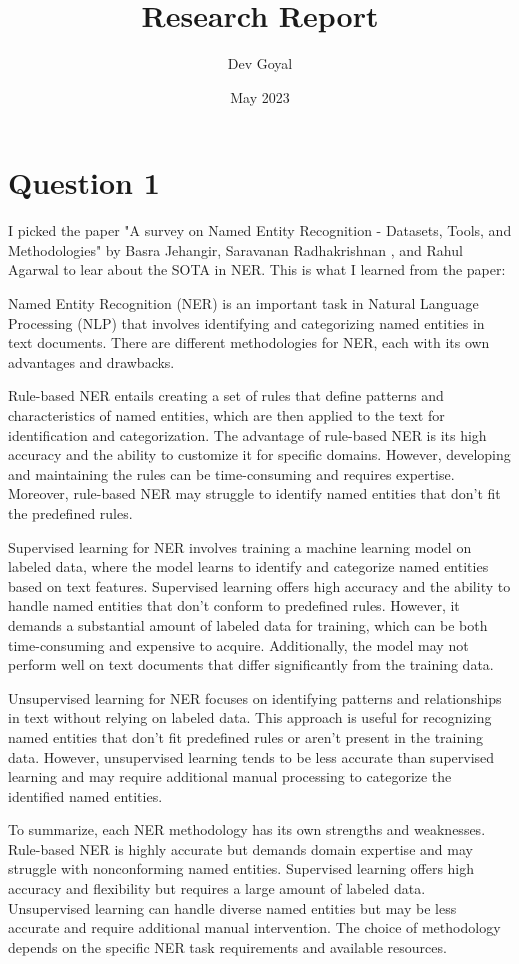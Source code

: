 \documentclass{article}
\title{Research Report}
\author{Dev Goyal}
\date{May 2023}
\begin{document}
\maketitle

\section{Question 1}

I picked the paper "A survey on Named Entity Recognition - Datasets, Tools, and
Methodologies" by Basra Jehangir, Saravanan Radhakrishnan , and Rahul Agarwal to lear about the SOTA in NER. This is what I learned from the paper:

Named Entity Recognition (NER) is an important task in Natural Language Processing (NLP) that involves identifying and categorizing named entities in text documents. There are different methodologies for NER, each with its own advantages and drawbacks.

Rule-based NER entails creating a set of rules that define patterns and characteristics of named entities, which are then applied to the text for identification and categorization. The advantage of rule-based NER is its high accuracy and the ability to customize it for specific domains. However, developing and maintaining the rules can be time-consuming and requires expertise. Moreover, rule-based NER may struggle to identify named entities that don't fit the predefined rules.

Supervised learning for NER involves training a machine learning model on labeled data, where the model learns to identify and categorize named entities based on text features. Supervised learning offers high accuracy and the ability to handle named entities that don't conform to predefined rules. However, it demands a substantial amount of labeled data for training, which can be both time-consuming and expensive to acquire. Additionally, the model may not perform well on text documents that differ significantly from the training data.

Unsupervised learning for NER focuses on identifying patterns and relationships in text without relying on labeled data. This approach is useful for recognizing named entities that don't fit predefined rules or aren't present in the training data. However, unsupervised learning tends to be less accurate than supervised learning and may require additional manual processing to categorize the identified named entities.

To summarize, each NER methodology has its own strengths and weaknesses. Rule-based NER is highly accurate but demands domain expertise and may struggle with nonconforming named entities. Supervised learning offers high accuracy and flexibility but requires a large amount of labeled data. Unsupervised learning can handle diverse named entities but may be less accurate and require additional manual intervention. The choice of methodology depends on the specific NER task requirements and available resources.
\end{document}

